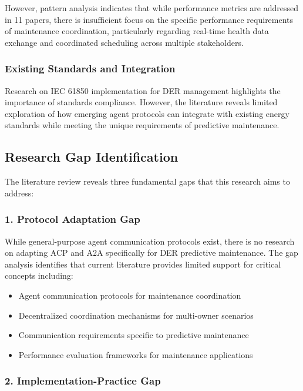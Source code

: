 \documentclass[12pt,a4paper]{article}
\begin{document}
However, pattern analysis indicates that while performance metrics are addressed in 11 papers, there is insufficient focus on the specific performance requirements of maintenance coordination, particularly regarding real-time health data exchange and coordinated scheduling across multiple stakeholders.

\subsubsection{Existing Standards and Integration}

Research on IEC 61850 implementation for DER management highlights the importance of standards compliance. However, the literature reveals limited exploration of how emerging agent protocols can integrate with existing energy standards while meeting the unique requirements of predictive maintenance.

\subsection{Research Gap Identification}

The literature review reveals three fundamental gaps that this research aims to address:

\subsubsection{1. Protocol Adaptation Gap}

While general-purpose agent communication protocols exist, there is no research on adapting ACP and A2A specifically for DER predictive maintenance. The gap analysis identifies that current literature provides limited support for critical concepts including:
\begin{itemize}
\item Agent communication protocols for maintenance coordination
\item Decentralized coordination mechanisms for multi-owner scenarios
\item Communication requirements specific to predictive maintenance
\item Performance evaluation frameworks for maintenance applications
\end{itemize}

\subsubsection{2. Implementation-Practice Gap}
\end{document}
